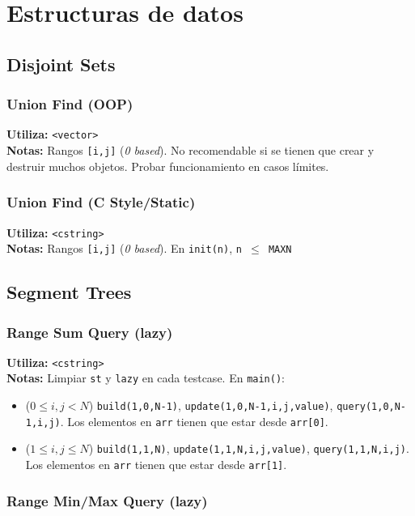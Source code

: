 \section{Estructuras de datos}

\subsection{Disjoint Sets}
\subsubsection{Union Find (OOP)}
\begin{footnotesize}
	\textbf{Utiliza:} \texttt{<vector>}\\
	\textbf{Notas:} Rangos \texttt{[i,j]} (\textit{0 based}). No recomendable si se tienen que crear y destruir muchos objetos. Probar funcionamiento en casos l\'imites. 
\end{footnotesize}

\subsubsection{Union Find (C Style/Static)}
\begin{footnotesize}
	\textbf{Utiliza:} \texttt{<cstring>}\\
	\textbf{Notas:} Rangos \texttt{[i,j]} (\textit{0 based}). En \texttt{init(n)}, \texttt{n $\leq$ MAXN}
\end{footnotesize}


\subsection{Segment Trees}
\subsubsection{Range Sum Query (lazy)}
\begin{footnotesize}
	\textbf{Utiliza:} \texttt{<cstring>}\\
	\textbf{Notas:} Limpiar \texttt{st} y \texttt{lazy} en cada testcase. En \texttt{main()}: \\
	\begin{itemize}
		\item ($ 0 \leq i,j < N $) \texttt{build(1,0,N-1)}, \texttt{update(1,0,N-1,i,j,value)}, \texttt{query(1,0,N-1,i,j)}. Los elementos en \texttt{arr} tienen que estar desde \texttt{arr[0]}.
		\item ($ 1 \leq i,j \leq N $) \texttt{build(1,1,N)}, \texttt{update(1,1,N,i,j,value)}, \texttt{query(1,1,N,i,j)}. Los elementos en \texttt{arr} tienen que estar desde \texttt{arr[1]}.
	\end{itemize}
\end{footnotesize}


\subsubsection{Range Min/Max Query (lazy)}
